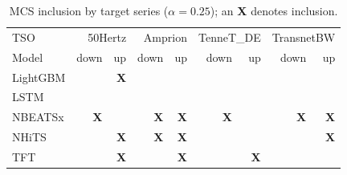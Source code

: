 \begin{table}
\caption{MCS inclusion by target series ($\alpha=0.25$); an \textbf{X} denotes inclusion.}
\begin{tabular}{lrrrrrrrr}
\toprule
TSO & \multicolumn{2}{r}{50Hertz} & \multicolumn{2}{r}{Amprion} & \multicolumn{2}{r}{TenneT_DE} & \multicolumn{2}{r}{TransnetBW} \\
Model & down & up & down & up & down & up & down & up \\
\midrule
LightGBM &  & \textbf{X} &  &  &  &  &  &  \\
LSTM &  &  &  &  &  &  &  &  \\
NBEATSx & \textbf{X} &  & \textbf{X} & \textbf{X} & \textbf{X} &  & \textbf{X} & \textbf{X} \\
NHiTS &  & \textbf{X} & \textbf{X} & \textbf{X} &  &  &  & \textbf{X} \\
TFT &  & \textbf{X} &  & \textbf{X} &  & \textbf{X} &  &  \\
\bottomrule
\end{tabular}
\end{table}
